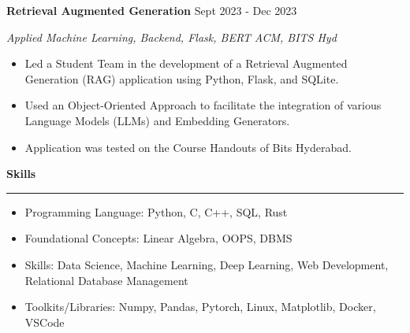\documentclass[a4paper,12pt]{report}
\begin{document}
\noindent 
\textbf{Retrieval Augmented Generation} \hfill  {\fontsize{12pt}{12pt}\selectfont Sept 2023 - Dec 2023} \par
\noindent
{\fontsize{12pt}{12pt}\selectfont \textit{Applied Machine Learning, Backend, Flask, BERT}\hfill\textit{ ACM, BITS Hyd}} \par
\noindent 
\begin{itemize}[noitemsep,topsep=0pt]
    \item {\fontsize{12pt}{12pt}\selectfont Led a Student Team in the development of a Retrieval Augmented Generation (RAG) application using Python, Flask, and SQLite. } \par
    \item {\fontsize{12pt}{12pt}\selectfont Used an Object-Oriented Approach to facilitate the integration of various Language Models (LLMs) and Embedding Generators. } \par
    \item {\fontsize{12pt}{12pt}\selectfont Application was tested on the Course Handouts of Bits Hyderabad.} \par
\end{itemize}

 \par
\vspace{9pt}


\noindent 
\textbf{Skills} \par
\vspace{2pt}
\hrule
\vspace{6pt}
\noindent 
\begin{itemize}[noitemsep,topsep=0pt]
\item {\fontsize{12pt}{12pt}\selectfont Programming Language:}  Python, C, C++, SQL, Rust \par
\noindent 
\item {\fontsize{12pt}{12pt}\selectfont Foundational Concepts:} Linear Algebra, OOPS, DBMS \par
\noindent 
\item {\fontsize{12pt}{12pt}\selectfont Skills:} Data Science, Machine Learning, Deep Learning, Web Development, Relational Database Management \par
\noindent 
\item {\fontsize{12pt}{12pt}\selectfont Toolkits/Libraries:} Numpy, Pandas, Pytorch, Linux, Matplotlib, Docker, VSCode \par
\end{itemize}
\end{document}

